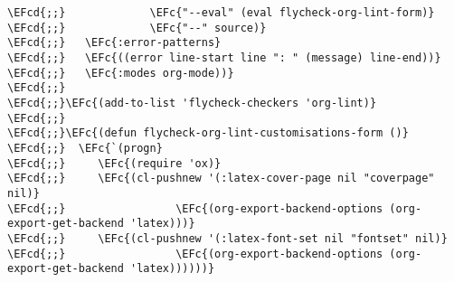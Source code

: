 \documentclass{article}
\newcommand{\EFc}[1]{\textcolor{EFc}{#1}} %
\newcommand{\EFcd}[1]{\textcolor{EFcd}{#1}} %
\begin{document}
\begin{Code}
\begin{Verbatim}
\EFcd{;;}             \EFc{"--eval" (eval flycheck-org-lint-form)}
\EFcd{;;}             \EFc{"--" source)}
\EFcd{;;}   \EFc{:error-patterns}
\EFcd{;;}   \EFc{((error line-start line ": " (message) line-end))}
\EFcd{;;}   \EFc{:modes org-mode))}
\EFcd{;;}
\EFcd{;;}\EFc{(add-to-list 'flycheck-checkers 'org-lint)}
\EFcd{;;}
\EFcd{;;}\EFc{(defun flycheck-org-lint-customisations-form ()}
\EFcd{;;}  \EFc{`(progn}
\EFcd{;;}     \EFc{(require 'ox)}
\EFcd{;;}     \EFc{(cl-pushnew '(:latex-cover-page nil "coverpage" nil)}
\EFcd{;;}                 \EFc{(org-export-backend-options (org-export-get-backend 'latex)))}
\EFcd{;;}     \EFc{(cl-pushnew '(:latex-font-set nil "fontset" nil)}
\EFcd{;;}                 \EFc{(org-export-backend-options (org-export-get-backend 'latex))))))}


\end{Verbatim}
\end{Code}
\end{document}
